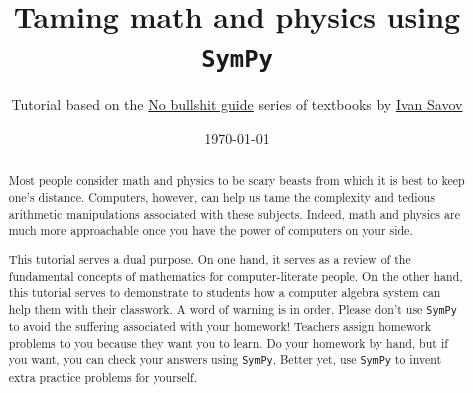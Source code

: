 \documentclass[9pt]{IEEEtran}
\title{{\Huge Taming math and physics using \texttt{SymPy} }}
\author{{\normalsize Tutorial based on the \href{http://minireference.com}{{\sc No bullshit guide}} series of textbooks by \href{mailto:ivan.savov+SYMPYTUT@gmail.com}{Ivan Savov}}}
\date{\today}
\begin{document}
\makeatletter
\preto{\@verbatim}{\topsep=0pt \partopsep=0pt \vspace{-1.2mm}}
\makeatother



        \maketitle


\begin{abstract}
Most people consider math and physics to be scary beasts from which it is best to keep one's distance.
Computers, however, can help us tame the complexity and tedious arithmetic manipulations associated with these subjects.
Indeed, math and physics are much more approachable once you have the power of computers on your side.
%

This tutorial serves a dual purpose.
On one hand, it serves as a review of the fundamental concepts of mathematics for computer-literate people.
On the other hand, this tutorial serves to demonstrate to students how a computer algebra system 
can help them with their classwork.
A word of warning is in order.
Please don't use \texttt{SymPy} to avoid the suffering associated with your homework!
Teachers assign homework problems to you
because they want you to learn.
Do your homework by hand,
but if you want, you can check your answers using \texttt{SymPy}.
Better yet, use \texttt{SymPy} to invent extra practice problems for yourself.
%



\end{abstract}

\begin{spacing}{-1}
\tableofcontents
\end{spacing}
\end{document}
